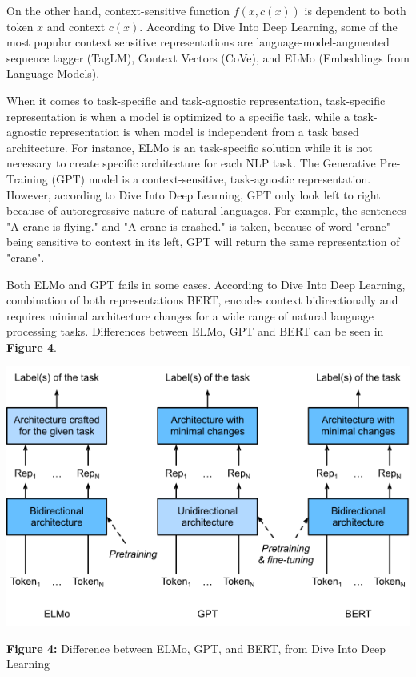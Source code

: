 \documentclass[man]{apa7}
\begin{document}
On the other hand, context-sensitive function $f(x,c(x))$ is dependent to both token $x$ and context $c(x)$. According to Dive Into Deep Learning, some of the most popular context sensitive representations are language-model-augmented sequence tagger (TagLM), Context Vectors (CoVe), and ELMo (Embeddings from Language Models).

When it comes to task-specific and task-agnostic representation, task-specific representation is when a model is optimized to a specific task, while a task-agnostic representation is when model is independent from a task based architecture. For instance, ELMo is an task-specific solution while it is not necessary to create specific architecture for each NLP task. The Generative Pre-Training  (GPT) model is a context-sensitive, task-agnostic representation. However, according to Dive Into Deep Learning, GPT only look left to right because of autoregressive nature of natural languages. For example, the sentences "A crane is flying." and "A crane is crashed." is taken, because of word "crane" being sensitive to context in its left, GPT will return the same representation of "crane".

Both ELMo and GPT fails in some cases. According to Dive Into Deep Learning, combination of both representations BERT, encodes context bidirectionally and requires minimal architecture changes for a wide range of natural language processing tasks. Differences between ELMo, GPT and BERT can be seen in \textbf{Figure 4}.
\\[2\baselineskip]

\begin{center}
\includegraphics[scale=0.6]{elmo-gpt-bert.png}

\textbf{Figure 4:} Difference between ELMo, GPT, and BERT, from Dive Into Deep Learning\\[2\baselineskip]
\end{center}
\end{document}
